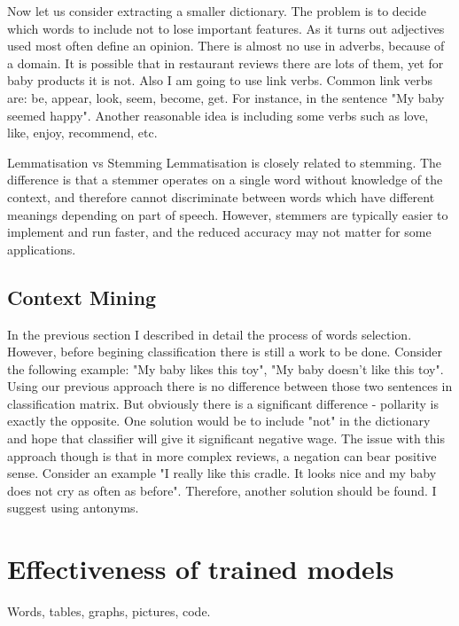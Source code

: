 \documentclass[12pt]{report}
\begin{document}
Now let us consider extracting a smaller dictionary. The problem is to decide which words to include not to lose important features. As it turns out adjectives used most often define an opinion. There is almost no use in adverbs, because of a domain. It is possible that in restaurant reviews there are lots of them, yet for baby products it is not.  Also I am going to use link verbs. Common link verbs are: be, appear, look, seem, become, get. For instance, in the sentence "My baby seemed happy". Another reasonable idea is including some verbs such as love, like, enjoy, recommend, etc.

Lemmatisation vs Stemming
Lemmatisation is closely related to stemming. The difference is that a stemmer operates on a single word without knowledge of the context, and therefore cannot discriminate between words which have different meanings depending on part of speech. However, stemmers are typically easier to implement and run faster, and the reduced accuracy may not matter for some applications.

\newpage

\section{Context Mining}

In the previous section I described in detail the process of words selection. However, before begining classification there is still a work to be done. Consider the following example: "My baby likes this toy", "My baby doesn't like this toy". Using our previous approach there is no difference between those two sentences in classification matrix. But obviously there is a significant difference - pollarity is exactly the opposite. One solution would be to include "not" in the dictionary and hope that classifier will give it significant negative wage. The issue with this approach though is that in more complex reviews, a negation can bear positive sense. Consider an example "I really like this cradle. It looks nice and my baby does not cry as often as before". Therefore, another solution should be found. I suggest using antonyms.

\newpage

\chapter{Effectiveness of trained models}

Words, tables, graphs, pictures, code.
\end{document}
